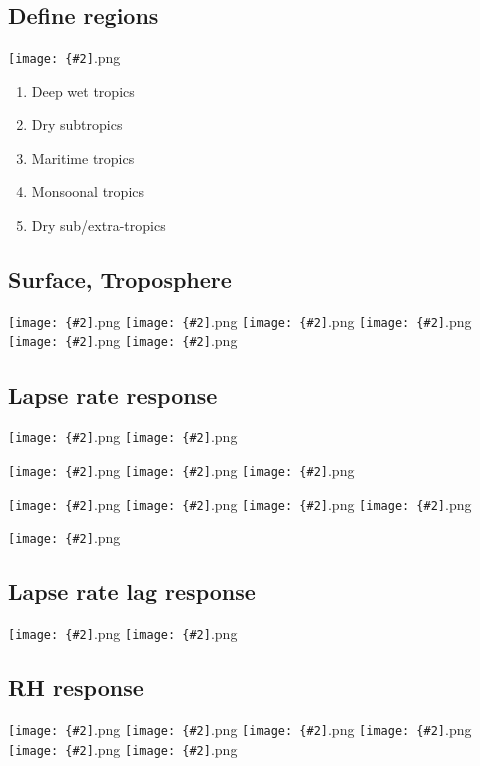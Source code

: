 \documentclass[12pt,a4paper]{article}
\newcommand{\pngfig}[2][0.5]{\texttt{[image: \{\#2]}.png}}
\begin{document}
\section{}
\subsection{Define regions}
\pngfig[0.7]{index_Tmax_700}
\begin{enumerate}
	\item Deep wet tropics
	\item Dry subtropics
	\item Maritime tropics
	\item Monsoonal tropics
	\item Dry sub/extra-tropics
	\end{enumerate}

\subsection{Surface, Troposphere}
\pngfig[0.5]{comp_Tmax_sfc}
\pngfig[0.5]{comp_RHmax_1000}
\pngfig[0.5]{comp_Tmax_700}
\pngfig[0.5]{comp_RHmax_700}
\pngfig[0.5]{comp_Tmax_300}
\pngfig[0.5]{comp_RHmax_300}

\subsection{Lapse rate response}
\pngfig[0.5]{regprof_TO_Zon_NH}
\pngfig[0.5]{comp_trop_zonal_profiles_m06}

\pngfig[0.5]{zonal_prof_land}
\pngfig[0.5]{zonal_prof_ocean}
\pngfig[0.5]{zonal_prof}

\pngfig[0.5]{theta_zonal_prof_land}
\pngfig[0.5]{theta_zonal_prof_ocean}
\pngfig[0.5]{theta_zonal_prof}
\pngfig[0.5]{theta_zonal_prof_zoom}


\pngfig[0.5]{cont_maxtemp_profile}

\subsection{Lapse rate lag response}

\pngfig[0.5]{3d_lag_lat15_30_v1}
\pngfig[0.5]{3d_lag_lat15_30_v2}

\pagebreak

\subsection{RH response}
\pngfig[0.5]{comp_RHmax_1000}
\pngfig[0.5]{comp_RHmin_1000}
\pngfig[0.5]{comp_RHmax_700}
\pngfig[0.5]{comp_RHmin_700}
\pngfig[0.5]{comp_RHmax_300}
\pngfig[0.5]{comp_RHmin_300}
\end{document}
